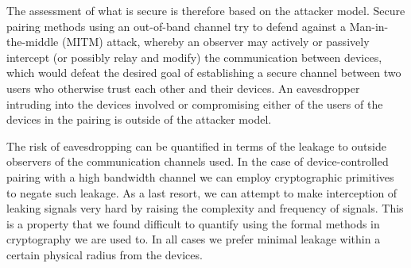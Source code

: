\documentclass[conference, 11pt]{sty/IEEEtran}
\begin{document}
The assessment of what is secure is therefore based on the attacker model.
Secure pairing methods using an out-of-band channel try to defend against a Man-in-the-middle (MITM) attack, whereby an observer may actively or passively intercept (or possibly relay and modify) the communication between devices, which would defeat the desired goal of establishing a secure channel between two users who otherwise trust each other and their devices.
An eavesdropper intruding into the devices involved or compromising either of the users of the devices in the pairing is outside of the attacker model.

The risk of eavesdropping can be quantified in terms of the leakage to outside observers of the communication channels used.
In the case of device-controlled pairing with a high bandwidth channel we can employ cryptographic primitives to negate such leakage.
As a last resort, we can attempt to make interception of leaking signals very hard by raising the complexity and frequency of signals.
This is a property that we found difficult to quantify using the formal methods in cryptography we are used to.
In all cases we prefer minimal leakage within a certain physical radius from the devices.
\end{document}
